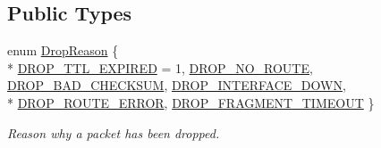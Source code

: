 \subsection*{Public Types}
\begin{DoxyCompactItemize}
\item 
enum \hyperlink{classns3_1_1Ipv4RouterL3Protocol_a050d08aa42fe2c3f9c133a263e121fcd}{Drop\-Reason} \{ \\*
\hyperlink{classns3_1_1Ipv4RouterL3Protocol_a050d08aa42fe2c3f9c133a263e121fcdaa4940eaf513382cd5e6d580a12610c21}{D\-R\-O\-P\-\_\-\-T\-T\-L\-\_\-\-E\-X\-P\-I\-R\-E\-D} = 1, 
\hyperlink{classns3_1_1Ipv4RouterL3Protocol_a050d08aa42fe2c3f9c133a263e121fcdaed5a0bb11a898cfc1050d9087a5030dc}{D\-R\-O\-P\-\_\-\-N\-O\-\_\-\-R\-O\-U\-T\-E}, 
\hyperlink{classns3_1_1Ipv4RouterL3Protocol_a050d08aa42fe2c3f9c133a263e121fcdaa7a09de0c3a08a72d5e443151d0d9f95}{D\-R\-O\-P\-\_\-\-B\-A\-D\-\_\-\-C\-H\-E\-C\-K\-S\-U\-M}, 
\hyperlink{classns3_1_1Ipv4RouterL3Protocol_a050d08aa42fe2c3f9c133a263e121fcdab55f6d41f00ca4c6ab4a2211ec9ee1f2}{D\-R\-O\-P\-\_\-\-I\-N\-T\-E\-R\-F\-A\-C\-E\-\_\-\-D\-O\-W\-N}, 
\\*
\hyperlink{classns3_1_1Ipv4RouterL3Protocol_a050d08aa42fe2c3f9c133a263e121fcda9543ec21a03e3ee4a394152ca8f15a95}{D\-R\-O\-P\-\_\-\-R\-O\-U\-T\-E\-\_\-\-E\-R\-R\-O\-R}, 
\hyperlink{classns3_1_1Ipv4RouterL3Protocol_a050d08aa42fe2c3f9c133a263e121fcda5616817187e3e89a1e76e65d30293abe}{D\-R\-O\-P\-\_\-\-F\-R\-A\-G\-M\-E\-N\-T\-\_\-\-T\-I\-M\-E\-O\-U\-T}
 \}
\begin{DoxyCompactList}\small\item\em Reason why a packet has been dropped. \end{DoxyCompactList}\end{DoxyCompactItemize}
